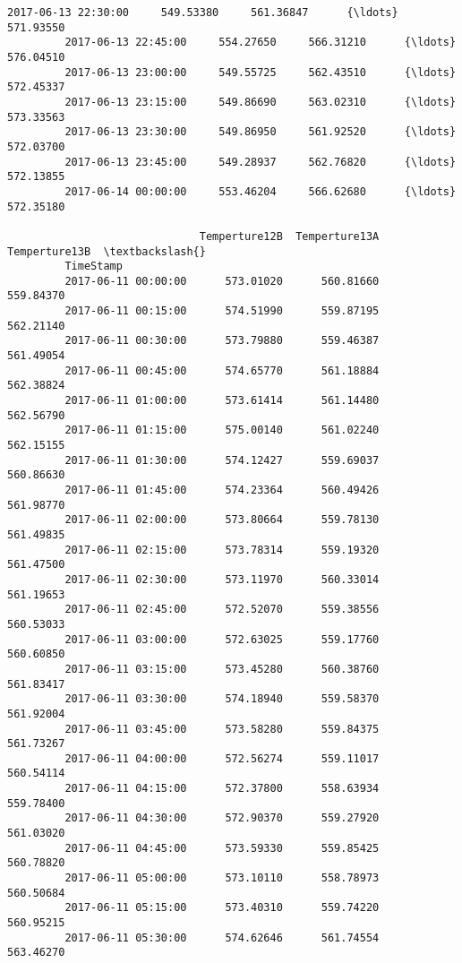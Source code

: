 \documentclass[11pt]{article}
\begin{document}
\begin{Verbatim}[commandchars=\\\{\}]
         2017-06-13 22:30:00     549.53380     561.36847      {\ldots}            571.93550   
         2017-06-13 22:45:00     554.27650     566.31210      {\ldots}            576.04510   
         2017-06-13 23:00:00     549.55725     562.43510      {\ldots}            572.45337   
         2017-06-13 23:15:00     549.86690     563.02310      {\ldots}            573.33563   
         2017-06-13 23:30:00     549.86950     561.92520      {\ldots}            572.03700   
         2017-06-13 23:45:00     549.28937     562.76820      {\ldots}            572.13855   
         2017-06-14 00:00:00     553.46204     566.62680      {\ldots}            572.35180   
         
                              Temperture12B  Temperture13A  Temperture13B  \textbackslash{}
         TimeStamp                                                          
         2017-06-11 00:00:00      573.01020      560.81660      559.84370   
         2017-06-11 00:15:00      574.51990      559.87195      562.21140   
         2017-06-11 00:30:00      573.79880      559.46387      561.49054   
         2017-06-11 00:45:00      574.65770      561.18884      562.38824   
         2017-06-11 01:00:00      573.61414      561.14480      562.56790   
         2017-06-11 01:15:00      575.00140      561.02240      562.15155   
         2017-06-11 01:30:00      574.12427      559.69037      560.86630   
         2017-06-11 01:45:00      574.23364      560.49426      561.98770   
         2017-06-11 02:00:00      573.80664      559.78130      561.49835   
         2017-06-11 02:15:00      573.78314      559.19320      561.47500   
         2017-06-11 02:30:00      573.11970      560.33014      561.19653   
         2017-06-11 02:45:00      572.52070      559.38556      560.53033   
         2017-06-11 03:00:00      572.63025      559.17760      560.60850   
         2017-06-11 03:15:00      573.45280      560.38760      561.83417   
         2017-06-11 03:30:00      574.18940      559.58370      561.92004   
         2017-06-11 03:45:00      573.58280      559.84375      561.73267   
         2017-06-11 04:00:00      572.56274      559.11017      560.54114   
         2017-06-11 04:15:00      572.37800      558.63934      559.78400   
         2017-06-11 04:30:00      572.90370      559.27920      561.03020   
         2017-06-11 04:45:00      573.59330      559.85425      560.78820   
         2017-06-11 05:00:00      573.10110      558.78973      560.50684   
         2017-06-11 05:15:00      573.40310      559.74220      560.95215   
         2017-06-11 05:30:00      574.62646      561.74554      563.46270   

\end{Verbatim}
\end{document}
